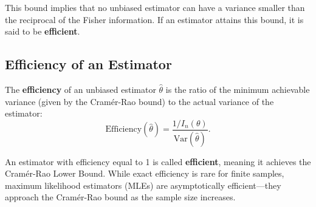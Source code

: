 \begin{center}
This bound implies that no unbiased estimator can have a variance smaller than the reciprocal of the Fisher information. If an estimator attains this bound, it is said to be \textbf{efficient}.

\subsection{Efficiency of an Estimator}

The \textbf{efficiency} of an unbiased estimator $\hat{\theta}$ is the ratio of the minimum achievable variance (given by the Cramér-Rao bound) to the actual variance of the estimator:
\[
\text{Efficiency}(\hat{\theta}) = \frac{1 / I_n(\theta)}{\mathrm{Var}(\hat{\theta})}.
\]

An estimator with efficiency equal to 1 is called \textbf{efficient}, meaning it achieves the Cramér-Rao Lower Bound. While exact efficiency is rare for finite samples, maximum likelihood estimators (MLEs) are asymptotically efficient—they approach the Cramér-Rao bound as the sample size increases.

\end{center}















